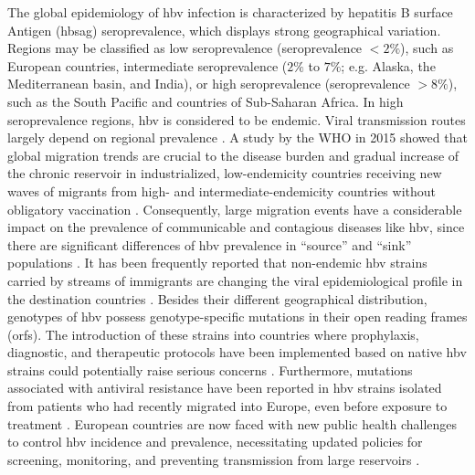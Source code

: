 The global epidemiology of \gls{hbv} infection is characterized by hepatitis B surface Antigen (\gls{hbsag}) seroprevalence, which displays strong geographical variation.
Regions may be classified as low seroprevalence (seroprevalence $< 2\%$), such as European countries, intermediate seroprevalence ($2\%$ to $7\%$; e.g. Alaska, the Mediterranean basin, and India), or high seroprevalence (seroprevalence $> 8\%$), such as the South Pacific and countries of Sub-Saharan Africa.
In high seroprevalence regions, \gls{hbv} is considered to be endemic.
Viral transmission routes largely depend on regional prevalence \citep{pourkarim2011molecular}.
A study by the WHO in 2015 showed that global migration trends are crucial to the disease burden and gradual increase of the chronic reservoir in industrialized, low-endemicity countries receiving new waves of migrants from high- and intermediate-endemicity countries without obligatory vaccination \citep{sharma_immigration_2015}.
Consequently, large migration events have a considerable impact on the prevalence of communicable and contagious diseases like \gls{hbv}, since there are significant differences of \gls{hbv} prevalence in ``source'' and ``sink'' populations \citep{chu_changing_2013}.
It has been frequently reported that non-endemic \gls{hbv} strains carried by streams of immigrants are changing the viral epidemiological profile in the destination countries \citep{pourkarim2011molecular,chu_changing_2013,khan_transmission_2008,mina_15year_2017,coppola_hepatitis_2017,thijssen_mass_2019}.
Besides their different geographical distribution, genotypes of \gls{hbv} possess genotype-specific mutations in their open reading frames (\gls{orf}s).
The introduction of these strains into countries where prophylaxis, diagnostic, and therapeutic protocols have been implemented based on native \gls{hbv} strains could potentially raise serious concerns \citep{lampertico_optimal_2015,velkov_global_2020,limeres_impact_2019}.
Furthermore, mutations associated with antiviral resistance have been reported in \gls{hbv} strains isolated from patients who had recently migrated into Europe, even before exposure to treatment \citep{bottecchia2011detection,selabe_mutations_2007}.
European countries are now faced with new public health challenges to control \gls{hbv} incidence and prevalence, necessitating updated policies for screening, monitoring, and preventing transmission from large reservoirs \citep{schweitzer2015estimations,thijssen_mass_2019}.\\

